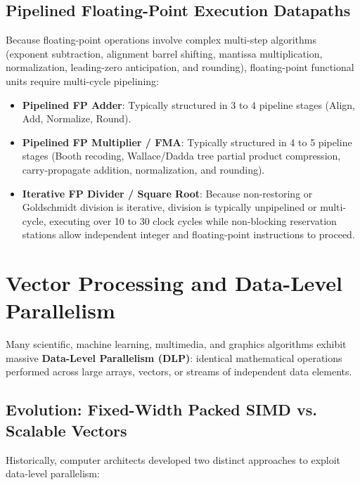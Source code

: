 \subsection{Pipelined Floating-Point Execution Datapaths}
Because floating-point operations involve complex multi-step algorithms (exponent subtraction, alignment barrel shifting, mantissa multiplication, normalization, leading-zero anticipation, and rounding), floating-point functional units require multi-cycle pipelining:
\begin{itemize}
    \item \textbf{Pipelined FP Adder}: Typically structured in 3 to 4 pipeline stages (Align, Add, Normalize, Round).
    \item \textbf{Pipelined FP Multiplier / FMA}: Typically structured in 4 to 5 pipeline stages (Booth recoding, Wallace/Dadda tree partial product compression, carry-propagate addition, normalization, and rounding).
    \item \textbf{Iterative FP Divider / Square Root}: Because non-restoring or Goldschmidt division is iterative, division is typically unpipelined or multi-cycle, executing over 10 to 30 clock cycles while non-blocking reservation stations allow independent integer and floating-point instructions to proceed.
\end{itemize}


\section{Vector Processing and Data-Level Parallelism}\label{sec:vector_processing}

Many scientific, machine learning, multimedia, and graphics algorithms exhibit massive \textbf{Data-Level Parallelism (DLP)}: identical mathematical operations performed across large arrays, vectors, or streams of independent data elements.

\subsection{Evolution: Fixed-Width Packed SIMD vs. Scalable Vectors}
Historically, computer architects developed two distinct approaches to exploit data-level parallelism:

